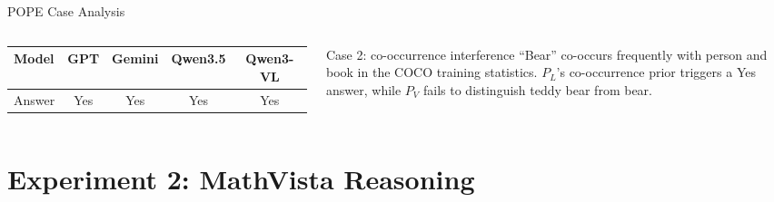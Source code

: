 \documentclass[9pt,aspectratio=169]{beamer}
\begin{document}
\begin{frame}{POPE Case Analysis}
\begin{columns}[T,onlytextwidth]
      \vspace{0.25em}
      \renewcommand{\arraystretch}{0.9}
      \setlength{\tabcolsep}{4pt}
      \begin{tabular}{lcccc}
        \toprule
        Model & GPT & Gemini & Qwen3.5 & Qwen3-VL \\
        \midrule
        Answer & Yes & Yes & Yes & Yes \\
        \bottomrule
      \end{tabular}

      \begin{exampleblock}{Case 2: co-occurrence interference}
        \footnotesize
        ``Bear'' co-occurs frequently with person and book
        in the COCO training statistics.
        $P_L$'s co-occurrence prior triggers a Yes answer,
        while $P_V$ fails to distinguish teddy bear from bear.
      \end{exampleblock}
  \end{columns}
\end{frame}

\section{Experiment 2: MathVista Reasoning}
\end{document}
